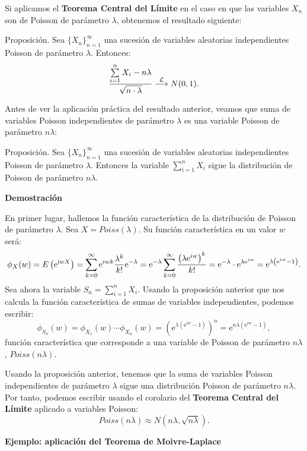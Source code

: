\documentclass[]{book}
\begin{document}
Si aplicamos el \textbf{Teorema Central del Límite} en el caso en que las variables \(X_n\) son de Poisson de parámetro \(\lambda\), obtenemos el resultado siguiente:

Proposición.
Sea \(\{X_n\}_{n=1}^\infty\) una sucesión de variables aleatorias independientes Poisson de parámetro \(\lambda\). Entonces:
\[
\frac{\sum\limits_{i=1}^n X_i -n\lambda}{\sqrt{n\cdot \lambda}}\stackrel{{\cal L}}{\longrightarrow} N(0,1).
\]

Antes de ver la aplicación práctica del resultado anterior, veamos que suma de variables Poisson independientes de parámetro \(\lambda\) es una variable Poisson de parámetro \(n\lambda\):

Proposición.
Sea \(\{X_n\}_{n=1}^\infty\) una sucesión de variables aleatorias independientes Poisson de parámetro \(\lambda\). Entonces la variable \(\sum\limits_{i=1}^n X_i\) sigue la distribución de Poisson de parámetro \(n\lambda\).

\textbf{Demostración}

En primer lugar, hallemos la función característica de la distribución de Poisson de parámetro \(\lambda\). Sea \(X=Poiss(\lambda)\). Su función característica en un valor \(w\) será:
\[
\scriptsize{
\phi_X(w)=E\left(\mathrm{e}^{\mathrm{i} w X}\right)=\sum_{k=0}^\infty \mathrm{e}^{i w k}\frac{\lambda^k}{k!}\mathrm{e}^{-\lambda}=\mathrm{e}^{-\lambda} \sum_{k=0}^\infty \frac{\left(\lambda\mathrm{e}^{iw}\right)^k}{k!}=\mathrm{e}^{-\lambda}\cdot \mathrm{e}^{\lambda\mathrm{e}^{iw}}=\mathrm{e}^{\lambda \left(\mathrm{e}^{iw}-1\right)}.
}
\]
Sea ahora la variable \(S_n=\sum\limits_{i=1}^n X_i\). Usando la proposición anterior que nos calcula la función característica de sumas de variables independientes, podemos escribir:
\[
\phi_{S_n}(w)=\phi_{X_1}(w)\cdots \phi_{X_n}(w)=\left(\mathrm{e}^{\lambda \left(\mathrm{e}^{iw}-1\right)}\right)^n =\mathrm{e}^{n\lambda \left(\mathrm{e}^{iw}-1\right)},
\]
función característica que corresponde a una variable de Poisson de parámetro \(n\lambda\), \(Poiss(n\lambda)\).

Usando la proposición anterior, tenemos que la suma de variables Poisson independientes de parámetro \(\lambda\) sigue una distribución Poisson de parámetro \(n\lambda\). Por tanto, podemos escribir usando el corolario del \textbf{Teorema Central del Límite} aplicado a variables Poisson:
\[
Poiss(n\lambda)\approx N(n\lambda,\sqrt{n\lambda}).
\]

\textbf{Ejemplo: aplicación del Teorema de Moivre-Laplace}
\end{document}
